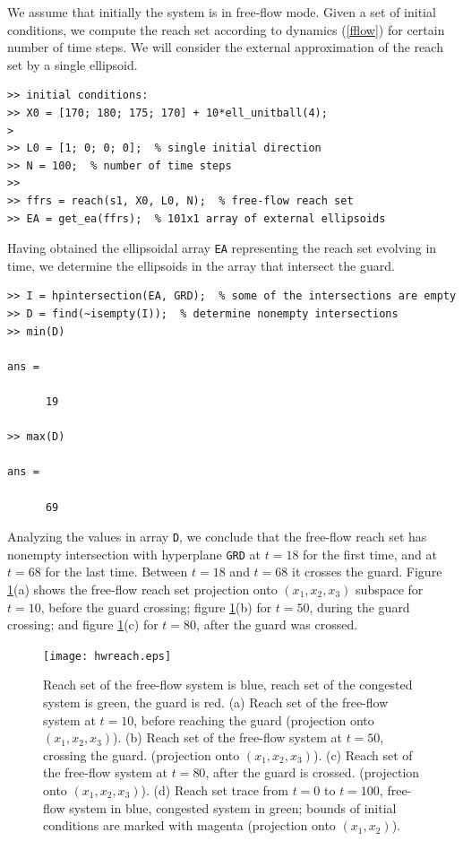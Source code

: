 We assume that initially the system is in free-flow mode.
Given a set of initial conditions, we  compute the reach set according
to dynamics (\ref{fflow}) for certain number of time steps.
We will consider the external approximation of the reach set by a single
ellipsoid.
{\tt \begin{verbatim}
>> initial conditions:
>> X0 = [170; 180; 175; 170] + 10*ell_unitball(4);
>
>> L0 = [1; 0; 0; 0];  % single initial direction
>> N = 100;  % number of time steps
>>
>> ffrs = reach(s1, X0, L0, N);  % free-flow reach set
>> EA = get_ea(ffrs);  % 101x1 array of external ellipsoids
\end{verbatim}}
Having obtained the ellipsoidal array {\tt EA} representing the reach set
evolving in time, we  determine the  ellipsoids in the array that
intersect the guard.
{\tt \begin{verbatim}
>> I = hpintersection(EA, GRD);  % some of the intersections are empty
>> D = find(~isempty(I));  % determine nonempty intersections
>> min(D)

ans =

      19

>> max(D)

ans =

      69
\end{verbatim}}
Analyzing the values in array {\tt D}, we conclude that the free-flow reach set
has nonempty intersection with hyperplane {\tt GRD} at $t=18$
for the first time, and at $t=68$ for the last time.
Between $t=18$ and
$t=68$ it crosses the guard. Figure \ref{hwreachfig}(a) shows the
free-flow reach set projection onto $(x_1,x_2,x_3)$ subspace for $t=10$,
before the guard crossing; figure \ref{hwreachfig}(b) for $t=50$,
during the guard crossing; and figure \ref{hwreachfig}(c) for $t=80$,
after the guard was crossed.
\begin{figure}[htbp]
\centerline{
\texttt{[image: hwreach.eps]}}
\caption{Reach set of the free-flow system is blue, reach set of the congested
system is green, the guard is red.
\newline
(a) Reach set of the free-flow system at $t = 10$, before reaching the guard
(projection onto $(x_1,x_2,x_3)$).
\newline
(b) Reach set of the free-flow system at $t = 50$, crossing the guard.
(projection onto $(x_1,x_2,x_3)$).
\newline
(c) Reach set of the free-flow system at $t = 80$, after the guard is crossed.
(projection onto $(x_1,x_2,x_3)$).
\newline
(d) Reach set trace from $t=0$ to $t=100$, free-flow system in blue,
congested system in green; bounds of initial conditions are marked with magenta
(projection onto $(x_1,x_2)$).  }
\label{hwreachfig}
\end{figure}

